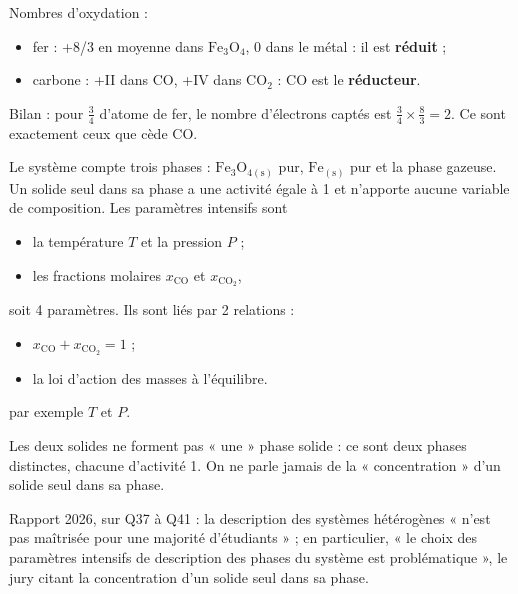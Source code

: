 \documentclass[11pt,a4paper]{article}
\providecommand{\tightlist}{\setlength{\itemsep}{0pt}\setlength{\parskip}{0pt}}
\newcommand{\equationajustee}[1]{%
  \sbox{\boiteequation}{$\displaystyle #1$}%
  \ifdim\wd\boiteequation>\linewidth
    \[\resizebox{\linewidth}{!}{\usebox{\boiteequation}}\]%
  \else
    \[#1\]%
  \fi}
\begin{document}
Nombres d'oxydation :

\begin{itemize}
\tightlist
\item
  fer : +8/3 en moyenne dans \(\mathrm{Fe_3O_4}\), 0 dans le métal : il est \textbf{réduit} ;
\item
  carbone : +II dans CO, +IV dans \(\mathrm{CO_2}\) : CO est le \textbf{réducteur}.
\end{itemize}

Bilan : pour \(\tfrac34\) d'atome de fer, le nombre d'électrons captés est \(\tfrac34\times\tfrac83=2\). Ce sont exactement ceux que cède CO.

Le système compte trois phases : \(\mathrm{Fe_3O_{4(s)}}\) pur, \(\mathrm{Fe_{(s)}}\) pur et la phase gazeuse. Un solide seul dans sa phase a une activité égale à 1 et n'apporte aucune variable de composition. Les paramètres intensifs sont

\begin{itemize}
\tightlist
\item
  la température \(T\) et la pression \(P\) ;
\item
  les fractions molaires \(x_{\mathrm{CO}}\) et \(x_{\mathrm{CO_2}}\),
\end{itemize}

soit 4 paramètres. Ils sont liés par 2 relations :

\begin{itemize}
\tightlist
\item
  \(x_{\mathrm{CO}}+x_{\mathrm{CO_2}}=1\) ;
\item
  la loi d'action des masses à l'équilibre.
\end{itemize}

\equationajustee{\boxed{v=4-2=2}}

par exemple \(T\) et \(P\).

\begin{piege}

Les deux solides ne forment pas « une » phase solide : ce sont deux phases distinctes, chacune d'activité 1. On ne parle jamais de la « concentration » d'un solide seul dans sa phase.

\end{piege}

\begin{jury}

Rapport 2026, sur Q37 à Q41 : la description des systèmes hétérogènes « n'est pas maîtrisée pour une majorité d'étudiants » ; en particulier, « le choix des paramètres intensifs de description des phases du système est problématique », le jury citant la concentration d'un solide seul dans sa phase.

\end{jury}
\end{document}

